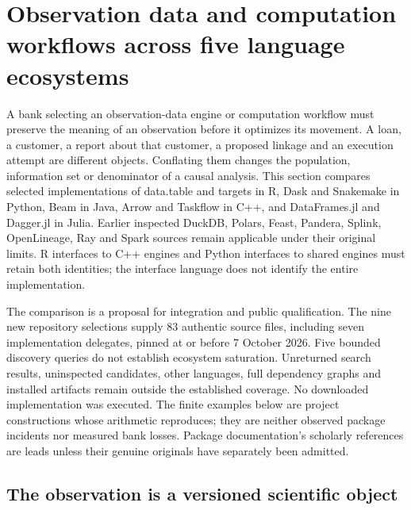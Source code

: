 \section[Observation data and computation workflows]{Observation data and computation workflows across five language ecosystems}
\label{sec:exec25-dww}

A bank selecting an observation-data engine or computation workflow must preserve the meaning of an observation before it optimizes its movement. A loan, a customer, a report about that customer, a proposed linkage and an execution attempt are different objects. Conflating them changes the population, information set or denominator of a causal analysis. This section compares selected implementations of data.table and targets in R, Dask and Snakemake in Python, Beam in Java, Arrow and Taskflow in C++, and DataFrames.jl and Dagger.jl in Julia. Earlier inspected DuckDB, Polars, Feast, Pandera, Splink, OpenLineage, Ray and Spark sources remain applicable under their original limits. R interfaces to C++ engines and Python interfaces to shared engines must retain both identities; the interface language does not identify the entire implementation.~\citep{exec25_dww_datatable,exec25_dww_targets,exec25_dww_dask,exec25_dww_snakemake,exec25_dww_beam,exec25_dww_arrow,exec25_dww_taskflow,exec25_dww_dataframes,exec25_dww_dagger,exec19_duckdb_source,exec23_polars_sources,exec25_otm_spark}

The comparison is a proposal for integration and public qualification. The nine new repository selections supply 83 authentic source files, including seven implementation delegates, pinned at or before 7 October 2026. Five bounded discovery queries do not establish ecosystem saturation. Unreturned search results, uninspected candidates, other languages, full dependency graphs and installed artifacts remain outside the established coverage. No downloaded implementation was executed. The finite examples below are project constructions whose arithmetic reproduces; they are neither observed package incidents nor measured bank losses. Package documentation's scholarly references are leads unless their genuine originals have separately been admitted.~\citep{exec25_dww_choice}

\subsection{The observation is a versioned scientific object}

